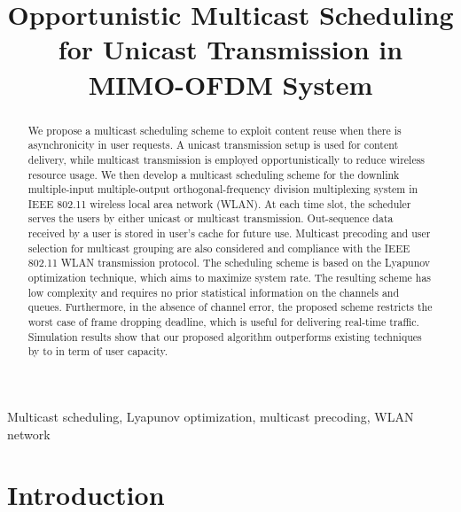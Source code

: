 \documentclass[conference]{IEEEtran}
\newcommand{\0}{\vect{0}}
\newcommand{\1}{\vect{1}}
\begin{document}
\title{Opportunistic Multicast Scheduling for Unicast Transmission in MIMO-OFDM System}

\author{
}


\maketitle

\begin{abstract}We propose a multicast scheduling scheme to exploit content reuse when there is asynchronicity in user requests. A unicast transmission setup is used for content delivery, while multicast transmission is employed opportunistically to reduce wireless resource usage. We then develop a multicast scheduling scheme for the downlink multiple-input multiple-output orthogonal-frequency division multiplexing system in IEEE 802.11 wireless local area network (WLAN). At each time slot, the scheduler serves the users by either unicast or multicast transmission. Out-sequence data received by a user is stored in user's cache for future use. Multicast precoding and user selection for multicast grouping are also considered and compliance with the IEEE 802.11 WLAN transmission protocol. The scheduling scheme is based on the Lyapunov optimization technique, which aims to maximize system rate. The resulting scheme has low complexity and requires no prior statistical information on the channels and queues. Furthermore, in the absence of channel error, the proposed scheme restricts the worst case of frame dropping deadline, which is useful for delivering real-time traffic. Simulation results show that our proposed algorithm outperforms existing techniques by  to  in term of user capacity.

\end{abstract}
\begin{keywords}
Multicast scheduling, Lyapunov optimization, multicast precoding, WLAN network
\end{keywords}

\section{Introduction}\label{sec:intro}
\end{document}
